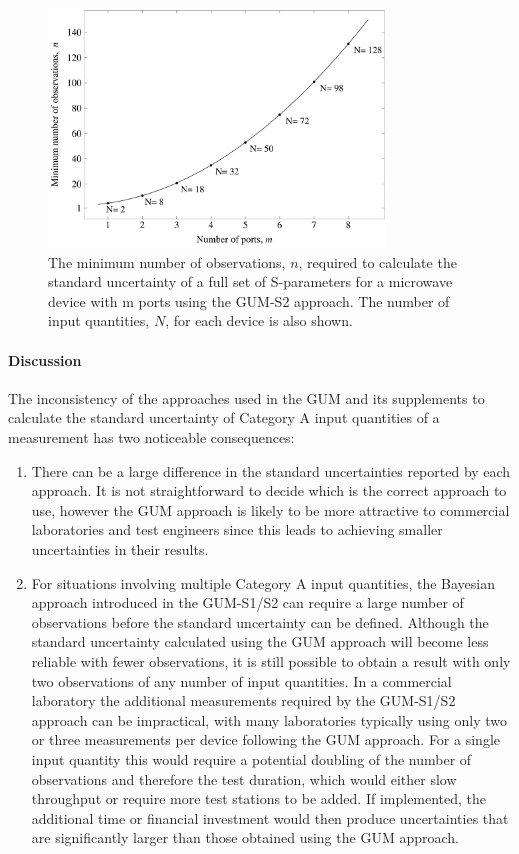 \documentclass[../thesis/thesis.tex]{subfiles}
\begin{document}
\begin{figure}
	\centering
	\includegraphics[width=0.8\textwidth]{gum_sparams.pdf}
	\caption[Plot of minimum observations for valid GUM Supplement uncertainty evaluation.]{The minimum number of observations, $n$, required to calculate the standard uncertainty of a full set of S-parameters for a microwave device with m ports using the GUM-S2 approach. The number of input quantities, $N$, for each device is also shown.}
	\label{ch3_fig_gum_sparams}
\end{figure}

\paragraph{Discussion}

The inconsistency of the approaches used in the GUM and its supplements to calculate the standard uncertainty of Category A input quantities of a measurement has two noticeable consequences:

\begin{enumerate}
	\item There can be a large difference in the standard uncertainties reported by each approach. It is not straightforward to decide which is the correct approach to use, however the GUM approach is likely to be more attractive to commercial laboratories and test engineers since this leads to achieving smaller uncertainties in their results.
	\item For situations involving multiple Category A input quantities, the Bayesian approach introduced in the GUM-S1/S2 can require a large number of observations before the standard uncertainty can be defined. Although the standard uncertainty calculated using the GUM approach will become less reliable with fewer observations, it is still possible to obtain a result with only two observations of any number of input quantities. In a commercial laboratory the additional measurements required by the GUM-S1/S2 approach can be impractical, with many laboratories typically using only two or three measurements per device following the GUM approach. For a single input quantity this would require a potential doubling of the number of observations and therefore the test duration, which would either slow throughput or require more test stations to be added. If implemented, the additional time or financial investment would then produce uncertainties that are significantly larger than those obtained using the GUM approach.
\end{enumerate}
\end{document}
